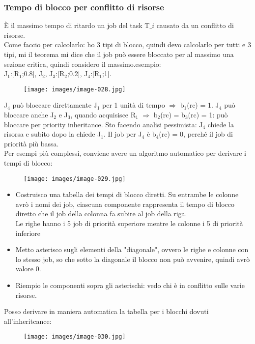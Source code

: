 \documentclass[12pt, oneside]{extbook}
\begin{document}
\subsubsection{Tempo di blocco per conflitto di risorse}
È il massimo tempo di ritardo un job del task T$\_{i}$ causato da un conflitto di risorse.\\ Come faccio per calcolarlo: ho 3 tipi di blocco, quindi devo calcolarlo per tutti e 3  tipi, mi il teorema mi dice che il job può essere bloccato per al massimo una sezione critica, quindi considero il massimo.esempio:\\ J$_{1}$:[R$_{1}$;0.8], J$_{2}$, J$_{3}$:[R$_{2}$;0.2], J$_{4}$:[R$_{1}$;1].\\ 
\begin{figure}[!h]
\centering
\texttt{[image: images/image-028.jpg]}
\end{figure}
J$_{4}$ può bloccare direttamente J$_{1}$ per 1 unità di tempo $\Rightarrow$ b$_{1}$(rc) = 1. J$_{4}$ può bloccare anche J$_{2}$ e J$_{3}$, quando acquisisce R$_{1}$ $\Rightarrow$ b$_{2}$(rc) = b$_{3}$(rc) = 1: può bloccare per priority inheritance. Sto facendo analisi pessimista: J$_{4}$ chiede la risorsa e subito dopo la chiede J$_{1}$. Il job per J$_{4}$ è b$_{4}$(rc) = 0, perché il job di priorità più bassa.\\ Per esempi più complessi, conviene avere un algoritmo automatico per derivare i tempi di blocco:
\begin{figure}[!h]
\centering
\texttt{[image: images/image-029.jpg]}
\end{figure}
\begin{itemize}
\item Costruisco una tabella dei tempi di blocco diretti. Su entrambe le colonne avrò i nomi dei job, ciascuna componente rappresenta il tempo di blocco diretto che il job della colonna fa subire al job della riga.\\ Le righe hanno i 5 job di priorità superiore mentre le colonne i 5 di priorità inferiore
\item Metto asterisco sugli elementi della "diagonale", ovvero le righe e colonne con lo stesso job, so che sotto la diagonale il blocco non può avvenire, quindi avrò valore 0.
\item Riempio le componenti sopra gli asterischi: vedo chi è in conflitto sulle varie risorse.
\end{itemize}
Posso derivare in maniera automatica la tabella per i blocchi dovuti all'inheritcance: 
\begin{figure}[!h]
\centering
\texttt{[image: images/image-030.jpg]}
\end{figure}
\end{document}
